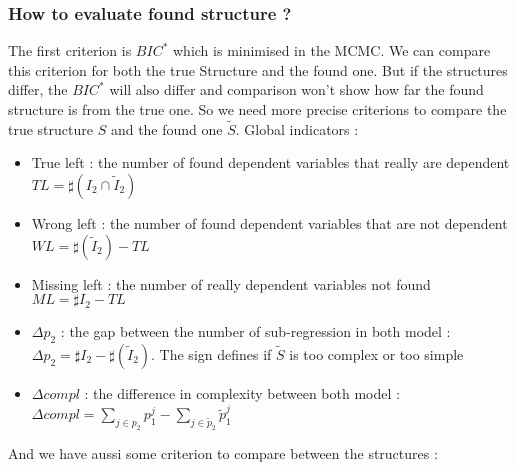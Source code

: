 \documentclass[11pt,a4paper]{article}
\begin{document}
		\subsubsection{How to evaluate found structure ?}
			The first criterion is $BIC^*$ which is minimised in the MCMC. We can compare this criterion for both the true Structure and the found one. But if the structures differ, the $BIC^*$ will also differ and comparison won't show how far the found structure is from the true one. So we need more precise criterions to compare the true structure $S$ and the found one $\tilde{S}$.
			Global indicators :
			\begin{itemize}
				\item True left : the number of found dependent variables that really are dependent $TL=\sharp(I_2\cap \tilde{I}_2)$ 
				\item Wrong left : the number of found dependent variables that are not dependent $WL=\sharp(\tilde{I}_2)-TL$
				\item Missing left : the number of really dependent variables not found $ML=\sharp{I_2}-TL$
				\item $\Delta p_2$ : the gap between the number of sub-regression in both model : $\Delta p_2=\sharp{I_2}-\sharp(\tilde{I}_2)$. The sign defines if $\tilde{S}$ is too complex or too simple
				\item $\Delta compl$ : the difference in complexity between both model : $\Delta compl=\sum_{j \in p_2}p_1^j-\sum_{j \in \tilde{p}_2}\tilde{p}_1^j$
			\end{itemize}
			And we have aussi some criterion to compare between the structures :				
\end{document}
